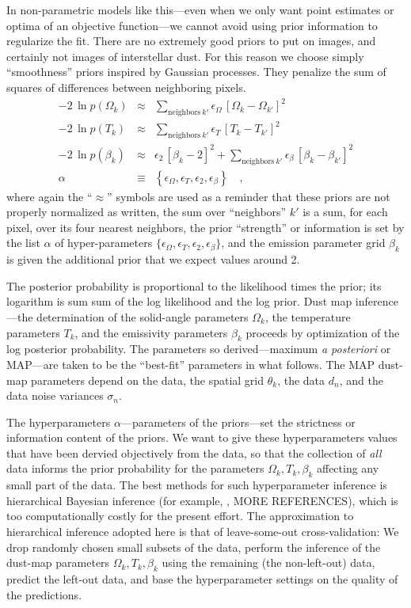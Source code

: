\documentclass[12pt,pdftex,preprint]{aastex}
\newcommand{\foreign}[1]{\textit{#1}}
\begin{document}
In non-parametric models like this---even when we only want point
estimates or optima of an objective function---we cannot avoid using
prior information to regularize the fit.  There are no extremely good
priors to put on images, and certainly not images of interstellar
dust.  For this reason we choose simply ``smoothness'' priors inspired
by Gaussian processes.  They penalize the sum of squares of
differences between neighboring pixels.
\begin{eqnarray}\displaystyle
-2\,\ln p(\Omega_k) &\approx& \sum_{\mathrm{neighbors}~k'} \epsilon_\Omega\,\left[\Omega_k - \Omega_{k'}\right]^2
\\
-2\,\ln p(T_k) &\approx& \sum_{\mathrm{neighbors}~k'} \epsilon_T\,\left[T_k - T_{k'}\right]^2
\\
-2\,\ln p(\beta_k) &\approx& \epsilon_2\,\left[\beta_k - 2\right]^2
                    + \sum_{\mathrm{neighbors}~k'} \epsilon_\beta\,\left[\beta_k - \beta_{k'}\right]^2
\\
\alpha &\equiv& \left\{\epsilon_\Omega, \epsilon_T, \epsilon_2, \epsilon_\beta\right\}
\quad ,
\end{eqnarray}
where again the ``$\approx$'' symbols are used as a reminder that
these priors are not properly normalized as written, the sum over
``neighbors'' $k'$ is a sum, for each pixel, over its four nearest
neighbors, the prior ``strength'' or information is set by the list
$\alpha$ of hyper-parameters $\{\epsilon_\Omega, \epsilon_T,
\epsilon_2, \epsilon_\beta\}$, and the emission parameter grid
$\beta_k$ is given the additional prior that we expect values around
2.

The posterior probability is proportional to the likelihood times the
prior; its logarithm is sum sum of the log likelihood and the log
prior.  Dust map inference---the determination of the solid-angle
parameters $\Omega_k$, the temperature parameters $T_k$, and the
emissivity parameters $\beta_k$ proceeds by optimization of the log
posterior probability.  The parameters so derived---maximum \foreign{a
  posteriori} or MAP---are taken to be the ``best-fit'' parameters in
what follows.  The MAP dust-map parameters depend on the data, the
spatial grid $\theta_k$, the data $d_n$, and the data noise variances
$\sigma_n$.

The hyperparameters $\alpha$---parameters of the priors---set the
strictness or information content of the priors.  We want to give
these hyperparameters values that have been dervied objectively from
the data, so that the collection of \emph{all} data informs the prior
probability for the parameters $\Omega_k, T_k, \beta_k$ affecting any
small part of the data.  The best methods for such hyperparameter
inference is hierarchical Bayesian inference (for example,
\citealt{eccentricity}, MORE REFERENCES), which is too computationally
costly for the present effort.  The approximation to hierarchical
inference adopted here is that of leave-some-out cross-validation: We
drop randomly chosen small subsets of the data, perform the inference
of the dust-map parameters $\Omega_k, T_k, \beta_k$ using the
remaining (the non-left-out) data, predict the left-out data, and base
the hyperparameter settings on the quality of the predictions.
\end{document}
